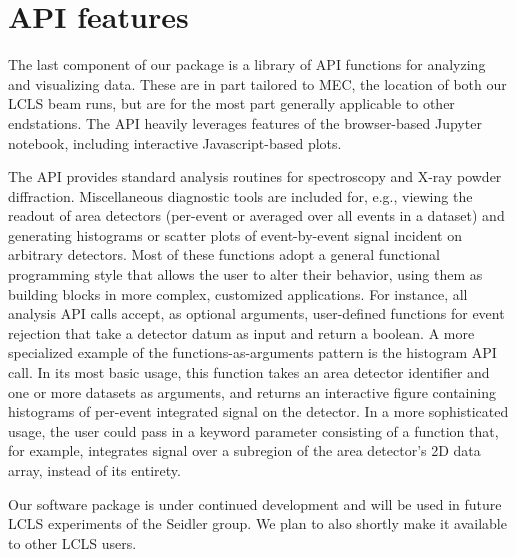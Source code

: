 \section{API features}
The last component of our package is a library of API functions for analyzing and visualizing data. These are in part tailored to MEC, the location of both our LCLS beam runs, but are for the most part generally applicable to other endstations. The API heavily leverages features of the browser-based Jupyter notebook, including interactive Javascript-based plots.


The API provides standard analysis routines for spectroscopy and X-ray powder diffraction. Miscellaneous diagnostic tools are included for, e.g., viewing the readout of area detectors (per-event or averaged over all events in a dataset) and generating histograms or scatter plots of event-by-event signal incident on arbitrary detectors. Most of these functions adopt a general functional programming style that allows the user to alter their behavior, using them as building blocks in more complex, customized applications. For instance, all analysis API calls accept, as optional arguments, user-defined functions for event rejection that take a detector datum as input and return a boolean. A more specialized example of the functions-as-arguments pattern is the histogram API call. In its most basic usage, this function takes an area detector identifier and one or more datasets as arguments, and returns an interactive figure containing histograms of per-event integrated signal on the detector. In a more sophisticated usage, the user could pass in a keyword parameter consisting of a function that, for example, integrates signal over a subregion of the area detector's 2D data array, instead of its entirety. 

Our software package is under continued development and will be used in future LCLS experiments of the Seidler group. We plan to also shortly make it available to other LCLS users. 


